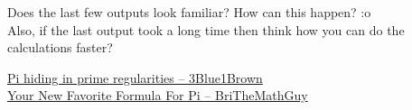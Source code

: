 \begin{noteI}
Does the last few outputs look familiar? How can this happen? :o\\
Also, if the last output took a long time then think how you can do the calculations faster?
\end{noteI}
\begin{funvideo}
\href{https://youtu.be/NaL_Cb42WyY}{Pi hiding in prime regularities -- 3Blue1Brown}\\
\href{https://youtu.be/VftM4LpTrkI}{Your New Favorite Formula For Pi -- BriTheMathGuy}
\end{funvideo}